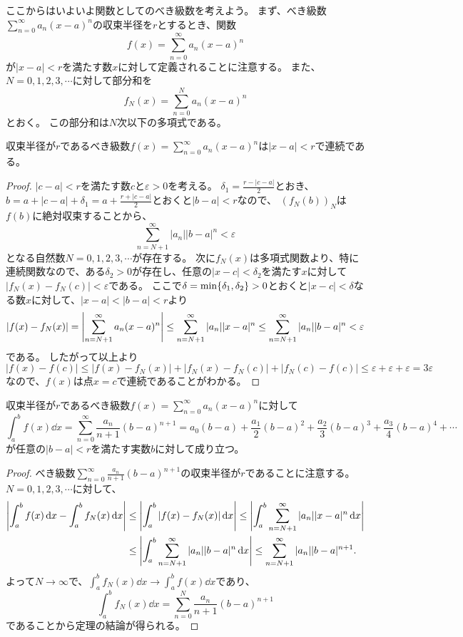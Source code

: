 ここからはいよいよ関数としてのべき級数を考えよう。
まず、べき級数$\sum_{n = 0}^\infty a_n(x-a)^n$の収束半径を$r$とするとき、関数
$$
f(x) = \sum_{n = 0}^\infty a_n(x-a)^n
$$
が$|x-a| < r$を満たす数$x$に対して定義されることに注意する。
また、$N = 0, 1, 2, 3, \cdots$に対して部分和を
$$
f_N(x) = \sum_{n = 0}^N a_n(x-a)^n
$$
とおく。
この部分和は$N$次以下の多項式である。

\begin{theorem}[べき級数の連続性]
収束半径が$r$であるべき級数$f(x) = \sum_{n = 0}^\infty a_n(x-a)^n$は$|x-a| < r$で連続である。
\end{theorem}

\begin{proof}
$|c-a| < r$を満たす数$c$と$\varepsilon > 0$を考える。
$\delta_1 = \frac{r-|c-a|}{2}$とおき、$b = a+|c-a|+\delta_1 = a+\frac{r+|c-a|}{2}$とおくと$|b-a| < r$なので、
$(f_N(b))_N$は$f(b)$に絶対収束することから、
$$
\sum_{n = N+1}^\infty |a_n||b-a|^n < \varepsilon
$$
となる自然数$N = 0, 1, 2, 3, \cdots$が存在する。
次に$f_N(x)$は多項式関数より、特に連続関数なので、ある$\delta_2 > 0$が存在し、任意の$|x-c| < \delta_2$を満たす$x$に対して$|f_N(x)-f_N(c)| < \varepsilon$である。
ここで$\delta = \min\{ \delta_1, \delta_2 \} > 0$とおくと$|x-c| < \delta$なる数$x$に対して、$|x-a| < |b-a| < r$より
$$
|f(x)-f_N(x)| = \abs{\sum_{n = N+1}^\infty a_n(x-a)^n} \le \sum_{n = N+1}^\infty |a_n||x-a|^n \le \sum_{n = N+1}^\infty |a_n||b-a|^n < \varepsilon
$$
である。
したがって以上より
$$
|f(x)-f(c)| \le |f(x)-f_N(x)|+|f_N(x)-f_N(c)|+|f_N(c)-f(c)|
\le \varepsilon+\varepsilon+\varepsilon = 3\varepsilon
$$
なので、$f(x)$は点$x = c$で連続であることがわかる。
\end{proof}

\begin{theorem}[べき級数の項別積分]
収束半径が$r$であるべき級数$f(x) = \sum_{n = 0}^\infty a_n(x-a)^n$に対して
$$
\int_a^b f(x)\dd{x} = \sum_{n = 0}^\infty \frac{a_n}{n+1}(b-a)^{n+1} = a_0(b-a)+\frac{a_1}{2}(b-a)^2+\frac{a_2}{3}(b-a)^3+\frac{a_3}{4}(b-a)^4+\cdots
$$
が任意の$|b-a| < r$を満たす実数$b$に対して成り立つ。
\end{theorem}

\begin{proof}
べき級数$\sum_{n = 0}^\infty \frac{a_n}{n+1}(b-a)^{n+1}$の収束半径が$r$であることに注意する。
$N = 0, 1, 2, 3, \cdots$に対して、
$$
\begin{aligned}
\abs{\int_a^b f(x)\dd{x}-\int_a^b f_N(x)\dd{x}}
&\le \abs{\int_a^b |f(x)-f_N(x)|\dd{x}}
\le \abs{\int_a^b \sum_{n = N+1}^\infty |a_n||x-a|^n\dd{x}} \\
&\le \abs{\int_a^b \sum_{n = N+1}^\infty |a_n||b-a|^n\dd{x}}
\le \sum_{n = N+1}^\infty |a_n||b-a|^{n+1}.
\end{aligned}
$$
よって$N \to \infty$で、$\int_a^b f_N(x)\dd{x} \to \int_a^b f(x)\dd{x}$であり、
$$
\int_a^b f_N(x)\dd{x} = \sum_{n = 0}^N \frac{a_n}{n+1}(b-a)^{n+1}
$$
であることから定理の結論が得られる。
\end{proof}

